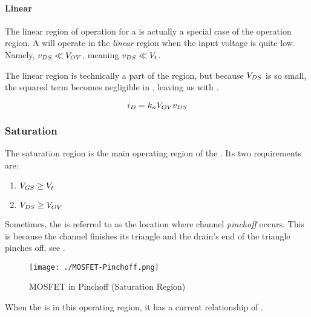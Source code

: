 \paragraph{Linear}\label{par:MOSFET_Linear_Region}
The linear region of operation for a  is actually a special case of the  operation region.
A  will operate in the \emph{linear} region when the input voltage is quite low.
Namely, $v_{DS} \ll V_{OV}$, meaning $v_{DS} \ll V_{t}$.

The linear region is technically a part of the  region, but because $V_{DS}$ is so small, the squared term becomes negligible in , leaving us with .

\begin{equation}\label{eq:MOSFET_Linear_Region-Current}
  i_{D} = k_{n} V_{OV} v_{DS}
\end{equation}

\subsubsection{Saturation}\label{subsubsec:MOSFET_Saturation_Region}
The saturation region is the main operating region of the .
Its two requirements are:
\begin{enumerate}[noitemsep]
\item $V_{GS} \geq V_{t}$
\item $V_{DS} \geq V_{OV}$
\end{enumerate}

Sometimes, the  is referred to as the location where channel \emph{pinchoff} occurs.
This is because the channel finishes its triangle and the drain's end of the triangle pinches off, see .

\begin{figure}[h!tbp]
  \centering
  \texttt{[image: ./MOSFET-Pinchoff.png]}
  \caption{MOSFET in Pinchoff (Saturation Region) \parencite[p.~259]{sedraTextbook7}}
  \label{fig:MOSFET-Pinchoff}
\end{figure}

When the  is in this operating region, it has a current relationship of .

